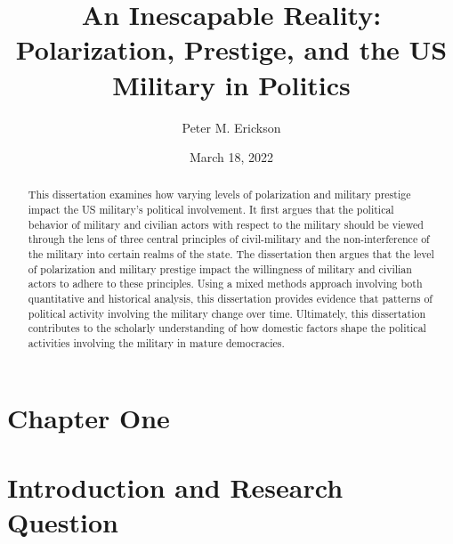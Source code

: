 \documentclass[
  12pt,
  oneside]{memoir}
\title{An Inescapable Reality: Polarization, Prestige, and the US Military in Politics}
\author{Peter M. Erickson}
\date{March 18, 2022}
\begin{document}
\maketitle
\begin{abstract}
This dissertation examines how varying levels of polarization and military
prestige impact the US military's political involvement. It first argues that the
political behavior of military and civilian actors with respect to the military
should be viewed through the lens of three central principles of civil-military
and the non-interference of the military into certain realms of the state. The dissertation
then argues that the level of polarization and military prestige impact the willingness
of military and civilian actors to adhere to these principles. Using a mixed methods
approach involving both quantitative and historical analysis, this dissertation
provides evidence that patterns of political activity involving the military change
over time. Ultimately, this dissertation contributes to the scholarly understanding
of how domestic factors shape the political activities involving the military in
mature democracies.
\end{abstract}

\cleardoublepage
\setcounter{page}{1}
\tableofcontents

\clearpage

\listoftables

\clearpage

\listoffigures

\RaggedRight

\mainmatter
{}
\DoubleSpacing
\setlength{\parindent}{2ex}
\newpage

\newpage

\hypertarget{chapter-one}{%
\chapter*{Chapter One}\label{chapter-one}}

\hypertarget{introduction-and-research-question}{%
\chapter{Introduction and Research Question}\label{introduction-and-research-question}}
\end{document}

